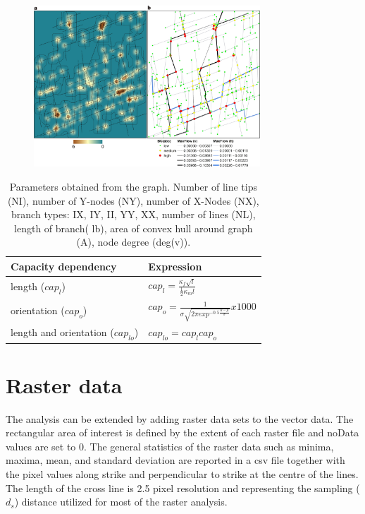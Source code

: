\documentclass[a4paper,fleqn]{cas-sc}
\begin{document}
\begin{figure}[h]
\centering
	\includegraphics[width=8.5cm]{fig09.jpg}
	\caption{}
\label{fig09}
\end{figure}


\begin{table}[width=.75\linewidth,cols=2,pos=h]
\caption{Parameters obtained from the graph. Number of line tips (NI), number of Y-nodes (NY), number of X-Nodes (NX), branch types: IX, IY, II, YY, XX, number of lines (NL), length of branch( lb), area of convex hull around graph (A), node degree (deg(v)).}\label{tbl03}
	\begin{tabular*}{\tblwidth}{@{} LL@{} }
		\toprule
		Capacity dependency & Expression\\
		\midrule
		length  ($cap_l$) 					& $ cap_l = \frac{\kappa_f \sqrt{l}}{\frac{1}{2}\kappa_m l}$\\
		orientation  ($cap_o$) 				& $cap_o = \frac{1}{\sigma \sqrt{2 \pi exp^{-0.5\frac{\alpha - \mu}{\sigma}}}} x 1000$\\
		length and orientation ($cap_{lo}$) & $cap_{lo} = cap_l cap_o$ \\
		\bottomrule
	\end{tabular*}
\end{table}

\section{Raster data}
The analysis can be extended by adding raster data sets to the vector data. The rectangular area of interest is defined by the extent of each raster file and noData values are set to 0. The general statistics of the raster data such as minima, maxima, mean, and standard deviation are reported in a csv file together with the pixel values along strike and perpendicular to strike at the centre of the lines. The length of the cross line is 2.5 pixel resolution and representing the sampling ($d_s$) distance utilized for most of the raster analysis.
 
\end{document}
